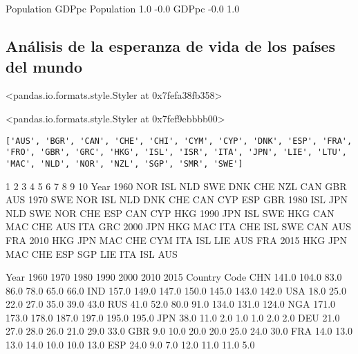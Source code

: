 \documentclass[11pt]{article}
\begin{document}
    \begin{center}
    \end{center}
    { \hspace*{\fill} \\}
    
    \begin{center}
    \end{center}
    { \hspace*{\fill} \\}
    
            Population  GDPpc
Population         1.0   -0.0
GDPpc             -0.0    1.0
            
    \subsection*{Análisis de la esperanza de vida de los países del
mundo}\label{anuxe1lisis-de-la-esperanza-de-vida-de-los-pauxedses-del-mundo}

<pandas.io.formats.style.Styler at 0x7fefa38fb358>
            
<pandas.io.formats.style.Styler at 0x7fef9ebbbb00>
            
    \begin{Verbatim}[commandchars=\\\{\}]
['AUS', 'BGR', 'CAN', 'CHE', 'CHI', 'CYM', 'CYP', 'DNK', 'ESP', 'FRA', 'FRO', 'GBR', 'GRC', 'HKG', 'ISL', 'ISR', 'ITA', 'JPN', 'LIE', 'LTU', 'MAC', 'NLD', 'NOR', 'NZL', 'SGP', 'SMR', 'SWE']

    \end{Verbatim}

       1    2    3    4    5    6    7    8    9    10
Year                                                  
1960  NOR  ISL  NLD  SWE  DNK  CHE  NZL  CAN  GBR  AUS
1970  SWE  NOR  ISL  NLD  DNK  CHE  CAN  CYP  ESP  GBR
1980  ISL  JPN  NLD  SWE  NOR  CHE  ESP  CAN  CYP  HKG
1990  JPN  ISL  SWE  HKG  CAN  MAC  CHE  AUS  ITA  GRC
2000  JPN  HKG  MAC  ITA  CHE  ISL  SWE  CAN  AUS  FRA
2010  HKG  JPN  MAC  CHE  CYM  ITA  ISL  LIE  AUS  FRA
2015  HKG  JPN  MAC  CHE  ESP  SGP  LIE  ITA  ISL  AUS
            
Year          1960  1970  1980  1990  2000  2010  2015
Country Code                                          
CHN          141.0 104.0  83.0  86.0  78.0  65.0  66.0
IND          157.0 149.0 147.0 150.0 145.0 143.0 142.0
USA           18.0  25.0  22.0  27.0  35.0  39.0  43.0
RUS           41.0  52.0  80.0  91.0 134.0 131.0 124.0
NGA          171.0 173.0 178.0 187.0 197.0 195.0 195.0
JPN           38.0  11.0   2.0   1.0   1.0   2.0   2.0
DEU           21.0  27.0  28.0  26.0  21.0  29.0  33.0
GBR            9.0  10.0  20.0  20.0  25.0  24.0  30.0
FRA           14.0  13.0  13.0  14.0  10.0  10.0  13.0
ESP           24.0   9.0   7.0  12.0  11.0  11.0   5.0
            
\end{document}
